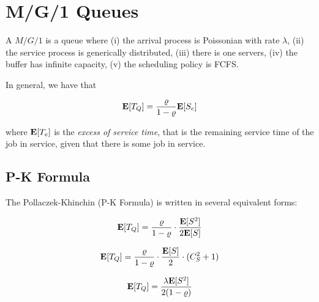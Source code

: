 \section{M/G/1 Queues}
\label{sec:M-G-1-queues}

A $M/G/1$ is a queue where 
(i) the arrival process is Poissonian with rate $\lambda$,
(ii) the service process is generically distributed,
(iii) there is one servers,
(iv) the buffer has infinite capacity,
(v) the scheduling policy is FCFS.


In general, we have that

\begin{equation}
\label{sec:M-G-1-Mean-Queue-Excess-Time}
\expected{T_{Q}}=\frac{\varrho}{1-\varrho}\expected{S_{e}}
\end{equation}

where $\mathbf{E}[T_{e}]$ is the \textit{excess of service time}, that is the remaining service time of the job in service, given that there is some job in service.



\subsection{P-K Formula}
\label{sec:PK-Formula}
The Pollaczek-Khinchin (P-K Formula) \cite{pollaczek1930aufgabe,khinchin1967mathematical} is written in several equivalent forms:

\begin{equation}
\mathbf{E}[T_{Q}]=\frac{\varrho}{1-\varrho}\cdot\frac{\mathbf{E}[S^{2}]}{2\mathbf{E}[S]}
\end{equation}

\begin{equation}
\mathbf{E}[T_{Q}]=\frac{\varrho}{1-\varrho}\cdot\frac{\mathbf{E}[S]}{2}\cdot(C_{S}^{2}+1)
\end{equation}

\begin{equation}
\mathbf{E}[T_{Q}]=\frac{\lambda\mathbf{E}[S^{2}]}{2(1-\varrho)}
\end{equation}